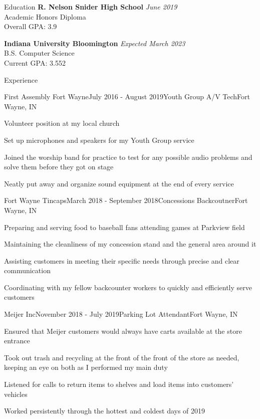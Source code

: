 \documentclass{resume}
\begin{document}
  \begin{rSection}{Education}
    {\bf R. Nelson Snider High School} \hfill {\em June 2019} \\
    { Academic Honors Diploma } \\
    Overall GPA: 3.9

    {\bf Indiana University Bloomington} \hfill {\em Expected March 2023} \\
    { B.S. Computer Science } \\
    Current GPA: 3.552
  \end{rSection}

  \begin{rSection}{Experience}

	\begin{rSubsection}{First Assembly Fort Wayne}{July 2016 - August 2019}{Youth Group A/V Tech}{Fort Wayne, IN}
	\item Volunteer position at my local church
	\item Set up microphones and speakers for my Youth Group service
	\item Joined the worship band for practice to test for any possible audio problems and solve them before they got on stage
	\item Neatly put away and organize sound equipment at the end of every service
	\end{rSubsection}

	\begin{rSubsection}{Fort Wayne Tincaps}{March 2018 - September 2018}{Concessions Backcoutner}{Fort Wayne, IN}
	\item Preparing and serving food to baseball fans attending games at Parkview field
	\item Maintaining the cleanliness of my concession stand and the general area around it
	\item Assisting customers in meeting their specific needs through precise and clear communication
	\item Coordinating with my fellow backcounter workers to quickly and efficiently serve customers
	\end{rSubsection}

	\begin{rSubsection}{Meijer Inc}{November 2018 - July 2019}{Parking Lot Attendant}{Fort Wayne, IN}
	\item Ensured that Meijer customers would always have carts available at the store entrance
	\item Took out trash and recycling at the front of the front of the store as needed, keeping an eye on both as I performed my main duty
	\item Listened for calls to return items to shelves and load items into customers' vehicles
	\item Worked persistently through the hottest and coldest days of 2019
	\end{rSubsection}


\end{rSection}
\end{document}
